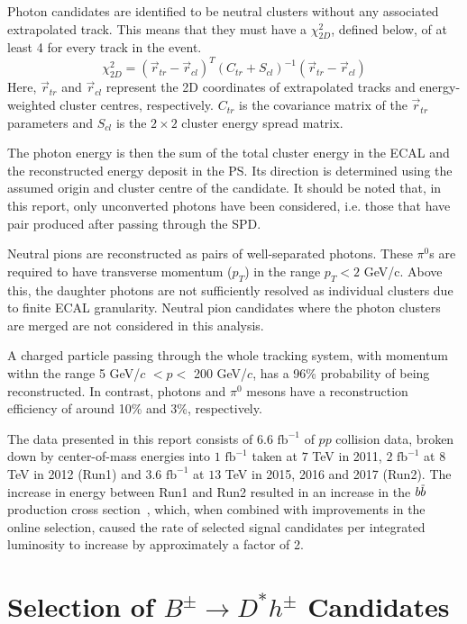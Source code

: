 \documentclass[oneside,12pt]{article}
\newcommand{\overbar}[1]{\mkern 1.5mu\overline{\mkern-1.5mu#1\mkern-1.5mu}\mkern
1.5mu}
\begin{document}
Photon candidates are identified to be neutral clusters without any associated
extrapolated track. This means that they must have a $\chi^2_{2D}$, defined
below, of at least 4 for every track in the event.
\begin{equation}
  \chi^2_{2D}=(\vec{r}_{tr}-\vec{r}_{cl})^T(C_{tr}+S_{cl})^{-1}(\vec{r}_{tr}-\vec{r}_{cl})
  \label{Chi2}
\end{equation}
\noindent Here, $\vec{r}_{tr}$ and $\vec{r}_{cl}$ represent the 2D coordinates
of extrapolated tracks and energy-weighted cluster centres, respectively.
$C_{tr}$ is the covariance matrix of the $\vec{r}_{tr}$ parameters and $S_{cl}$
is the $2 \times 2$ cluster energy spread matrix.  

The photon energy is then the sum of the total cluster energy in the ECAL and
the reconstructed energy deposit in the PS. Its direction is determined using
the assumed origin and cluster centre of the candidate. It should be noted that,
in this report, only unconverted photons have been considered, i.e. those that
have pair produced after passing through the SPD.

Neutral pions are reconstructed as pairs of well-separated photons. These
$\pi^0$s are required to have transverse momentum ($p_T$) in the range $p_{T}<2$
GeV/c.  Above this, the daughter photons are not sufficiently resolved as
individual clusters due to finite ECAL granularity. Neutral pion candidates
where the photon clusters are merged are not considered in this analysis.

A charged particle passing through the whole tracking system, with momentum
withn the range 5 GeV/$c$ $< p <$ 200 GeV/$c$, has a 96\% probability of being
reconstructed. In contrast, photons and $\pi^0$ mesons have a reconstruction
efficiency of around 10\% and 3\%, respectively.

The data presented in this report consists of $6.6$ $\text{fb}^{-1}$ of $pp$
collision data, broken down by center-of-mass energies into $1$ $\text{fb}^{-1}$ taken at $7$ TeV in 2011, $2$
$\text{fb}^{-1}$ at $8$ TeV in 2012 (Run1) and $3.6$ $\text{fb}^{-1}$ at $13$
TeV in 2015, 2016 and 2017 (Run2). The increase in energy between Run1 and Run2
resulted in an increase in the $b\overbar{b}$ production cross
section~\cite{PDG2018}, which, when combined with improvements in the online
selection, caused the rate of selected signal candidates per integrated
luminosity to increase by approximately a factor of 2.

\section{Selection of $B^{\pm}\rightarrow D^*h^{\pm}$ Candidates} \label{sec:selections}
\end{document}
